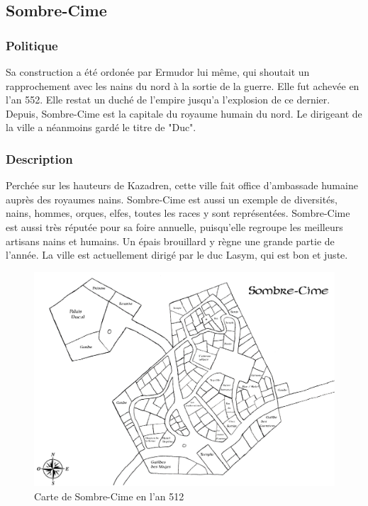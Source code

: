 \subsection{Sombre-Cime}
\subsubsection{Politique}
Sa construction a été ordonée par Ermudor lui même, qui shoutait un rapprochement avec les nains du nord à la sortie de la guerre. Elle fut achevée en l'an 552. Elle restat un duché de l'empire jusqu'a l'explosion de ce dernier.
\newline
Depuis, Sombre-Cime est la capitale du royaume humain du nord. Le dirigeant de la ville a néanmoins gardé le titre de "Duc".
\subsubsection{Description}
\hypertarget{sombrecime}{}Perchée sur les hauteurs de Kazadren, cette ville fait office d’ambassade humaine auprès des royaumes nains. Sombre-Cime est aussi un exemple de diversités, nains, hommes, orques, elfes, toutes les races y sont représentées. Sombre-Cime est aussi très réputée pour sa foire annuelle, puisqu’elle regroupe les meilleurs artisans nains et humains. Un épais brouillard y règne une grande partie de l’année. La ville est actuellement dirigé par le duc Lasym, qui est bon et juste.
\begin{figure}
 \begin{center}
   \includegraphics[scale=1.14, angle=90]{./Ressources/medieval/Carte_sombre_cime.jpg}
   \caption{Carte de Sombre-Cime en l'an 512}
 \end{center}
\end{figure}
